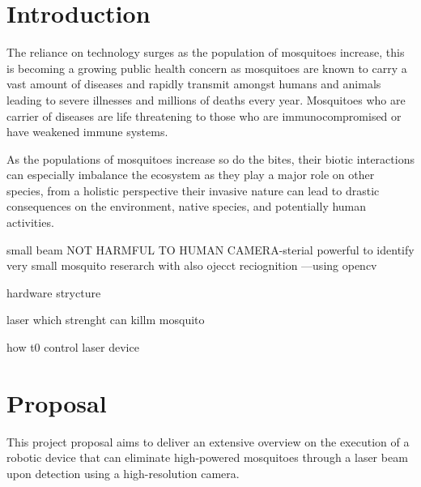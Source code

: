 \documentclass[11pt]{article}
\begin{document}
	
	
	\newpage
	\section{Introduction}
	
	The reliance on technology surges as the population of mosquitoes increase, this is becoming a growing public health concern as mosquitoes are known to carry a vast amount of diseases and rapidly transmit amongst humans and animals leading to severe illnesses and millions of deaths every year. Mosquitoes who are carrier of diseases are life threatening to those who are immunocompromised or have weakened immune systems.
	\cite{} 
	
	As the populations of mosquitoes increase so do the bites, their biotic %
	interactions can especially imbalance the ecosystem as they play a major role on other species, from a holistic perspective their invasive nature can lead to drastic consequences on the environment, native species, and potentially human activities.
	
	small beam NOT HARMFUL TO HUMAN
	CAMERA-sterial powerful to identify very small mosquito 
	reserarch with
	also ojecct reciognition ---using opencv 
	
	hardware strycture 
	
	laser which strenght can killm mosquito 
	
	
	how t0 control laser device 
	
	
	
	
	
	\section{Proposal}
	This project proposal aims to deliver an extensive overview on the execution of a robotic device that can eliminate high-powered mosquitoes through a laser beam upon detection using a high-resolution camera. 
	
	
\end{document}
